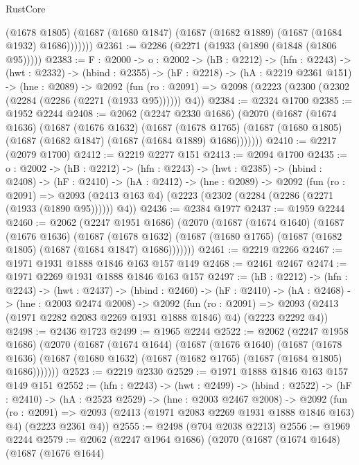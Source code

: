 \begin{lexlean}{RustCore}
\begin{coremodule}
{\begin{coremodule}
{{{            (@1678 @1805)
            (@1687 (@1680 @1847) (@1687 (@1682 @1889) (@1687 (@1684 @1932) @1686)))))))
@2361 := @2286 (@2271 (@1933 (@1890 (@1848 (@1806 @95)))))
@2383 := {F : @2000} ->
  {o : @2002} ->
  (hB : @2212) ->
  (hfn : @2243) ->
  (hwt : @2332) ->
  (hbind : @2355) ->
  (hF : @2218) ->
  (hA : @2219 @2361 @151) ->
  (hne : @2089) ->
  @2092 (fun (ro : @2091) => @2098 (@2223 (@2300 (@2302 (@2284 (@2286 (@2271 (@1933 @95)))))) @4))
@2384 := @2324 @1700
@2385 := @1952 @2244
@2408 := @2062
    (@2247 @2330 @1686)
    (@2070
      (@1687
        (@1674 @1636)
        (@1687
          (@1676 @1632)
          (@1687
            (@1678 @1765)
            (@1687 (@1680 @1805) (@1687 (@1682 @1847) (@1687 (@1684 @1889) @1686)))))))
@2410 := @2217 (@2079 @1700)
@2412 := @2219 @2277 @151
@2413 := @2094 @1700
@2435 := {o : @2002} ->
  (hB : @2212) ->
  (hfn : @2243) ->
  (hwt : @2385) ->
  (hbind : @2408) ->
  (hF : @2410) ->
  (hA : @2412) ->
  (hne : @2089) ->
  @2092
    (fun (ro : @2091) =>
    @2093 (@2413 @163 @4) (@2223 (@2302 (@2284 (@2286 (@2271 (@1933 (@1890 @95)))))) @4))
@2436 := @2384 @1977
@2437 := @1959 @2244
@2460 := @2062
    (@2247 @1951 @1686)
    (@2070
      (@1687
        (@1674 @1640)
        (@1687
          (@1676 @1636)
          (@1687
            (@1678 @1632)
            (@1687 (@1680 @1765) (@1687 (@1682 @1805) (@1687 (@1684 @1847) @1686)))))))
@2461 := @2219 @2266
@2467 := @1971 @1931 @1888 @1846 @163 @157 @149
@2468 := @2461 @2467
@2474 := @1971 @2269 @1931 @1888 @1846 @163 @157
@2497 := (hB : @2212) ->
  (hfn : @2243) ->
  (hwt : @2437) ->
  (hbind : @2460) ->
  (hF : @2410) ->
  (hA : @2468) ->
  (hne : @2003 @2474 @2008) ->
  @2092
    (fun (ro : @2091) =>
    @2093 (@2413 (@1971 @2282 @2083 @2269 @1931 @1888 @1846) @4) (@2223 @2292 @4))
@2498 := @2436 @1723
@2499 := @1965 @2244
@2522 := @2062
    (@2247 @1958 @1686)
    (@2070
      (@1687
        (@1674 @1644)
        (@1687
          (@1676 @1640)
          (@1687
            (@1678 @1636)
            (@1687 (@1680 @1632) (@1687 (@1682 @1765) (@1687 (@1684 @1805) @1686)))))))
@2523 := @2219 @2330
@2529 := @1971 @1888 @1846 @163 @157 @149 @151
@2552 := (hfn : @2243) ->
  (hwt : @2499) ->
  (hbind : @2522) ->
  (hF : @2410) ->
  (hA : @2523 @2529) ->
  (hne : @2003 @2467 @2008) ->
  @2092
    (fun (ro : @2091) =>
    @2093 (@2413 (@1971 @2083 @2269 @1931 @1888 @1846 @163) @4) (@2223 @2361 @4))
@2555 := @2498 (@704 @2038 @2213)
@2556 := @1969 @2244
@2579 := @2062
    (@2247 @1964 @1686)
    (@2070
      (@1687
        (@1674 @1648)
        (@1687
          (@1676 @1644)
}}}
\end{coremodule}}
\end{coremodule}
\end{lexlean}
